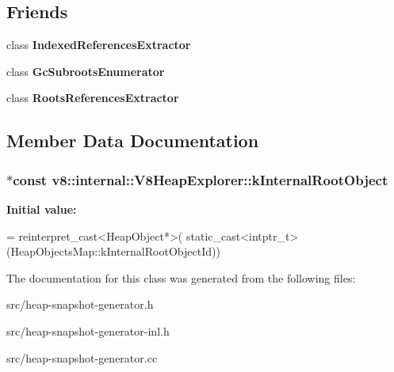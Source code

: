 \subsection*{Friends}
\begin{DoxyCompactItemize}
\item 
\hypertarget{classv8_1_1internal_1_1_v8_heap_explorer_a6ef0d133911e40c06746778027023e0a}{}class {\bfseries Indexed\+References\+Extractor}\label{classv8_1_1internal_1_1_v8_heap_explorer_a6ef0d133911e40c06746778027023e0a}

\item 
\hypertarget{classv8_1_1internal_1_1_v8_heap_explorer_a09409037b3bbe7dacbad8d92839b47a8}{}class {\bfseries Gc\+Subroots\+Enumerator}\label{classv8_1_1internal_1_1_v8_heap_explorer_a09409037b3bbe7dacbad8d92839b47a8}

\item 
\hypertarget{classv8_1_1internal_1_1_v8_heap_explorer_a07c650327bd63061c049a9ae184a0ba6}{}class {\bfseries Roots\+References\+Extractor}\label{classv8_1_1internal_1_1_v8_heap_explorer_a07c650327bd63061c049a9ae184a0ba6}

\end{DoxyCompactItemize}


\subsection{Member Data Documentation}
\hypertarget{classv8_1_1internal_1_1_v8_heap_explorer_a11ea29b92366425e7a817fbc9abf466f}{}
\subsubsection[{k\+Internal\+Root\+Object}]{ $\ast$const v8\+::internal\+::\+V8\+Heap\+Explorer\+::k\+Internal\+Root\+Object\hspace{0.3cm}{\ttfamily [static]}}\label{classv8_1_1internal_1_1_v8_heap_explorer_a11ea29b92366425e7a817fbc9abf466f}
{\bfseries Initial value\+:}
\begin{DoxyCode}
=
    \textcolor{keyword}{reinterpret\_cast<}HeapObject*\textcolor{keyword}{>}(
        \textcolor{keyword}{static\_cast<}intptr\_t\textcolor{keyword}{>}(HeapObjectsMap::kInternalRootObjectId))
\end{DoxyCode}


The documentation for this class was generated from the following files\+:\begin{DoxyCompactItemize}
\item 
src/heap-\/snapshot-\/generator.\+h\item 
src/heap-\/snapshot-\/generator-\/inl.\+h\item 
src/heap-\/snapshot-\/generator.\+cc\end{DoxyCompactItemize}
